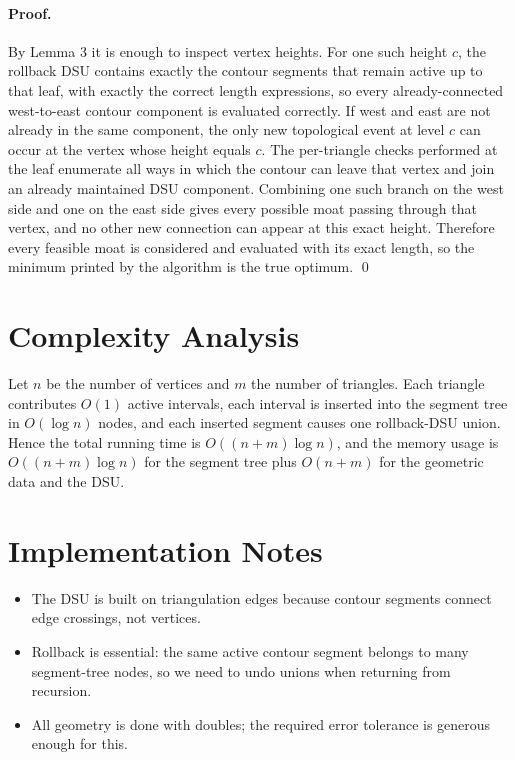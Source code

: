 \documentclass[11pt]{article}
\begin{document}
\paragraph{Proof.}
By Lemma 3 it is enough to inspect vertex heights.
For one such height $c$, the rollback DSU contains exactly the contour segments that remain active up to
that leaf, with exactly the correct length expressions, so every already-connected west-to-east contour
component is evaluated correctly.
If west and east are not already in the same component, the only new topological event at level $c$ can
occur at the vertex whose height equals $c$. The per-triangle checks performed at the leaf enumerate all
ways in which the contour can leave that vertex and join an already maintained DSU component.
Combining one such branch on the west side and one on the east side gives every possible moat passing
through that vertex, and no other new connection can appear at this exact height.
Therefore every feasible moat is considered and evaluated with its exact length, so the minimum printed
by the algorithm is the true optimum. \qed

\section*{Complexity Analysis}

Let $n$ be the number of vertices and $m$ the number of triangles.
Each triangle contributes $O(1)$ active intervals, each interval is inserted into the segment tree in
$O(\log n)$ nodes, and each inserted segment causes one rollback-DSU union.
Hence the total running time is $O((n+m)\log n)$, and the memory usage is $O((n+m)\log n)$ for the
segment tree plus $O(n+m)$ for the geometric data and the DSU.

\section*{Implementation Notes}

\begin{itemize}[leftmargin=*]
    \item The DSU is built on triangulation edges because contour segments connect edge crossings, not
    vertices.
    \item Rollback is essential: the same active contour segment belongs to many segment-tree nodes, so we
    need to undo unions when returning from recursion.
    \item All geometry is done with doubles; the required error tolerance is generous enough for this.
\end{itemize}
\end{document}
